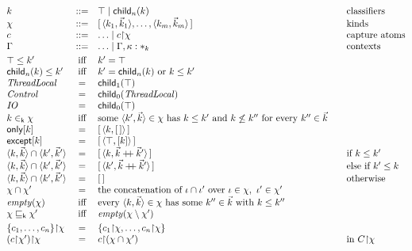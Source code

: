 \begin{figure}[tp]
\footnotesize
\color{tgtcol}
\[
\begin{array}{@{}lcl@{\qquad}l@{}}
k & ::= & \top \mid \clchild{n}{k} & \text{classifiers} \\
\chi & ::= & [\,\langle k_1, \vec{k}_1\rangle, \ldots, \langle k_m, \vec{k}_m\rangle\,] & \text{kinds} \\
c & ::= & \ldots \mid \restr{c}{\chi} & \text{capture atoms} \\
\Gamma & ::= & \ldots \mid \Gamma, \kappa : \clsb{k} & \text{contexts} \\[3pt]
\top \le k' & \text{iff} & k' = \top \\
\clchild{n}{k} \le k' & \text{iff} & k' = \clchild{n}{k} \text{ or } k \le k' \\
\mathit{ThreadLocal} & = & \clchild{1}{\top} \\
\mathit{Control} & = & \clchild{0}{\mathit{ThreadLocal}} \\
\mathit{IO} & = & \clchild{0}{\top} \\
\kcont{k}{\chi} & \text{iff} & \text{some } \langle k', \vec{k}\rangle \in \chi \text{ has } k \le k' \text{ and } k \not\le k'' \text{ for every } k'' \in \vec{k} \\
\konly{k} & = & [\,\langle k, [\,]\rangle\,] \\
\kexcept{k} & = & [\,\langle \top, [k]\rangle\,] \\
\langle k, \vec{k}\rangle \cap \langle k', \vec{k}'\rangle & = & [\,\langle k, \vec{k} \mathbin{+\!\!+} \vec{k}'\rangle\,] & \text{if } k \le k' \\
\langle k, \vec{k}\rangle \cap \langle k', \vec{k}'\rangle & = & [\,\langle k', \vec{k} \mathbin{+\!\!+} \vec{k}'\rangle\,] & \text{else if } k' \le k \\
\langle k, \vec{k}\rangle \cap \langle k', \vec{k}'\rangle & = & [\,] & \text{otherwise} \\
\chi \cap \chi' & = & \text{the concatenation of } \iota \cap \iota' \text{ over } \iota \in \chi,\ \iota' \in \chi' \\
\kempty{\chi} & \text{iff} & \text{every } \langle k, \vec{k}\rangle \in \chi \text{ has some } k'' \in \vec{k} \text{ with } k \le k'' \\
\subkind{\chi}{\chi'} & \text{iff} & \kempty{\chi \setminus \chi'} \\[3pt]
\restr{\cset{c_1, \ldots, c_n}}{\chi} & = & \cset{\restr{c_1}{\chi}, \ldots, \restr{c_n}{\chi}} \\
\restr{(\restr{c}{\chi'})}{\chi} & = & \restr{c}{(\chi \cap \chi')} & \text{in } \restr{C}{\chi} \\

\end{array}\]
\end{figure}
